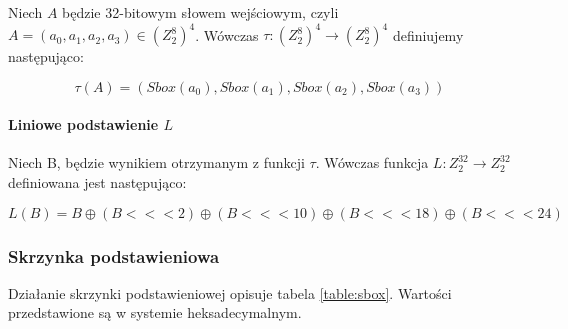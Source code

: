 Niech $A$ będzie 32-bitowym słowem wejściowym, czyli $A = (a_0, a_1, a_2, a_3) \in (Z^8_2)^4$. Wówczas $\tau: (Z^8_2)^4 \rightarrow (Z^8_2)^4$ definiujemy następująco:

\begin{equation*}
    \tau(A) = (Sbox(a_0), Sbox(a_1), Sbox(a_2), Sbox(a_3))
\end{equation*}

\paragraph{Liniowe podstawienie $L$}\mbox{}

Niech B, będzie wynikiem otrzymanym z funkcji $\tau$. Wówczas funkcja $L: Z^{32}_2 \rightarrow Z^{32}_2$ definiowana jest następująco:

\begin{equation*}
    L(B) = B \oplus (B <<< 2)  \oplus (B <<< 10)  \oplus (B <<< 18)  \oplus (B <<< 24) 
\end{equation*}

\subsubsection{Skrzynka podstawieniowa}

Działanie skrzynki podstawieniowej opisuje tabela \ref{table:sbox}. Wartości przedstawione są w systemie heksadecymalnym.

